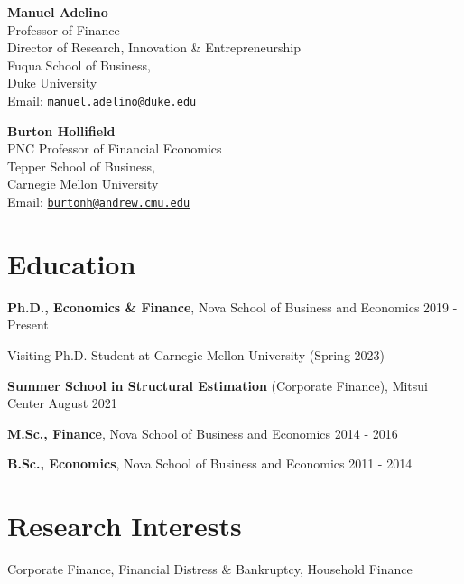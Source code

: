 \documentclass[letterpaper]{article}
\newenvironment{itemize*}{
  \begin{list}{}{
    \setlength{\leftmargin}{1.5em}
  }
}{
  \end{list}
}
\begin{document}
\begin{multicols}{2}
\textbf{Manuel Adelino} \\
Professor of Finance \\
Director of Research, Innovation \& Entrepreneurship \\
Fuqua School of Business, \\ 
Duke University \\
Email: \href{mailto:manuel.adelino@duke.edu}{\tt manuel.adelino@duke.edu} 
\columnbreak \hfill

\textbf{Burton Hollifield} \\
PNC Professor of Financial Economics \\ 
Tepper School of Business, \\
Carnegie Mellon University \\
Email: \href{mailto:burtonh@andrew.cmu.edu}{\tt burtonh@andrew.cmu.edu} 
\end{multicols}

\section*{Education}
\vspace{-0.2in}
\hrulefill
\begin{itemize*}
\item \textbf{Ph.D., Economics \& Finance}, Nova School of Business and Economics \hfill 2019 - Present
\item \phantom{aaa} Visiting Ph.D. Student at Carnegie Mellon University (Spring 2023)
\item \textbf{Summer School in Structural Estimation} (Corporate Finance), Mitsui Center \hfill August 2021
\item \textbf{M.Sc., Finance}, Nova School of Business and Economics \hfill 2014 - 2016
\item \textbf{B.Sc., Economics}, Nova School of Business and Economics \hfill  2011 - 2014
\end{itemize*}

\section*{Research Interests}
\vspace{-0.2in}
\hrulefill
\begin{itemize*}
\item Corporate Finance, Financial Distress \& Bankruptcy, Household Finance
\end{itemize*}
\end{document}
